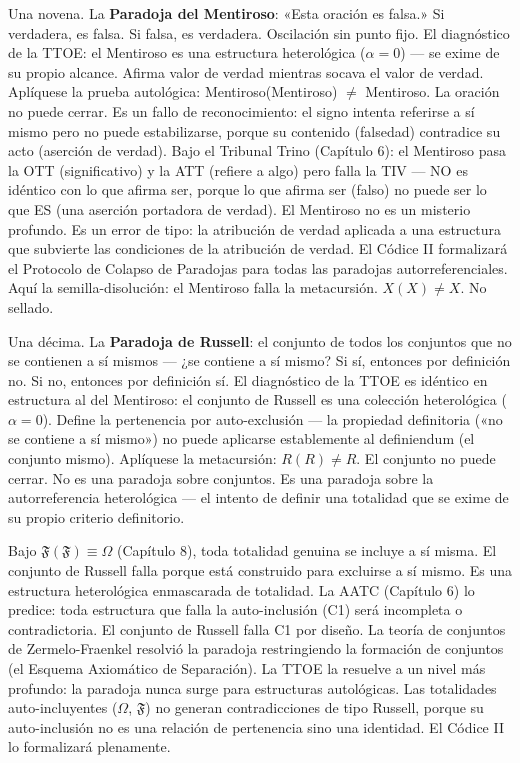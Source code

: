 \documentclass[10pt, openany, oneside]{book}
\begin{document}
Una novena. La \textbf{Paradoja del Mentiroso}: «Esta oración es falsa.» Si verdadera, es falsa. Si falsa, es verdadera. Oscilación sin punto fijo. El diagnóstico de la TTOE: el Mentiroso es una estructura heterológica ($\alpha = 0$) --- se exime de su propio alcance. Afirma valor de verdad mientras socava el valor de verdad. Aplíquese la prueba autológica: Mentiroso(Mentiroso) $\neq$ Mentiroso. La oración no puede cerrar. Es un fallo de reconocimiento: el signo intenta referirse a sí mismo pero no puede estabilizarse, porque su contenido (falsedad) contradice su acto (aserción de verdad). Bajo el Tribunal Trino (Capítulo 6): el Mentiroso pasa la OTT (significativo) y la ATT (refiere a algo) pero falla la TIV --- NO es idéntico con lo que afirma ser, porque lo que afirma ser (falso) no puede ser lo que ES (una aserción portadora de verdad). El Mentiroso no es un misterio profundo. Es un error de tipo: la atribución de verdad aplicada a una estructura que subvierte las condiciones de la atribución de verdad. El Códice II formalizará el Protocolo de Colapso de Paradojas para todas las paradojas autorreferenciales. Aquí la semilla-disolución: el Mentiroso falla la metacursión. $X(X) \neq X$. No sellado.

Una décima. La \textbf{Paradoja de Russell}: el conjunto de todos los conjuntos que no se contienen a sí mismos --- ¿se contiene a sí mismo? Si sí, entonces por definición no. Si no, entonces por definición sí. El diagnóstico de la TTOE es idéntico en estructura al del Mentiroso: el conjunto de Russell es una colección heterológica ($\alpha = 0$). Define la pertenencia por auto-exclusión --- la propiedad definitoria («no se contiene a sí mismo») no puede aplicarse establemente al definiendum (el conjunto mismo). Aplíquese la metacursión: $R(R) \neq R$. El conjunto no puede cerrar. No es una paradoja sobre conjuntos. Es una paradoja sobre la autorreferencia heterológica --- el intento de definir una totalidad que se exime de su propio criterio definitorio.

Bajo $\mathfrak{F}(\mathfrak{F}) \equiv \Omega$ (Capítulo 8), toda totalidad genuina se incluye a sí misma. El conjunto de Russell falla porque está construido para excluirse a sí mismo. Es una estructura heterológica enmascarada de totalidad. La AATC (Capítulo 6) lo predice: toda estructura que falla la auto-inclusión (C1) será incompleta o contradictoria. El conjunto de Russell falla C1 por diseño. La teoría de conjuntos de Zermelo-Fraenkel resolvió la paradoja restringiendo la formación de conjuntos (el Esquema Axiomático de Separación). La TTOE la resuelve a un nivel más profundo: la paradoja nunca surge para estructuras autológicas. Las totalidades auto-incluyentes ($\Omega$, $\mathfrak{F}$) no generan contradicciones de tipo Russell, porque su auto-inclusión no es una relación de pertenencia sino una identidad. El Códice II lo formalizará plenamente.
\end{document}
